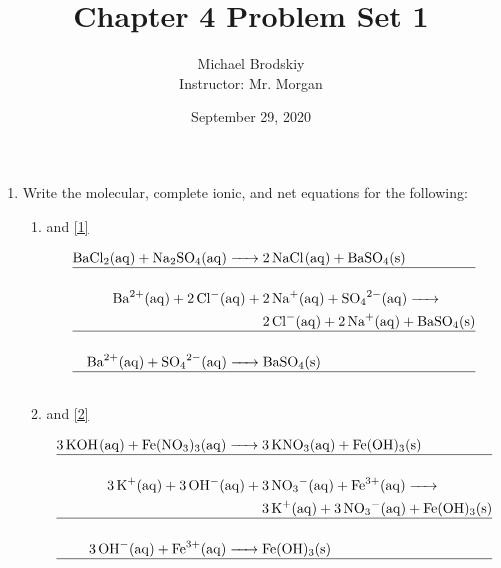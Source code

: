 \documentclass[12pt]{article}
\title{Chapter 4 Problem Set 1}
\date{September 29, 2020}
\author{Michael Brodskiy\\ \small Instructor: Mr. Morgan}
\begin{document}
\maketitle

\begin{enumerate}

  \item Write the molecular, complete ionic, and net equations for the following:

    \begin{enumerate}

      \item {} and  \eqref{1}

        \begin{equation}
          \begin{split}
            \ce{BaCl2(aq) + Na2SO4(aq) -> } & \ce{2NaCl(aq) + BaSO4(s)}\\
            \hline
            & \\
            \ce{Ba^2+(aq) + 2Cl-(aq) + } & \ce{2Na+(aq) + SO4^2-(aq) ->} \\
            & \ce{2Cl-(aq) + 2Na+(aq) + BaSO4(s)} \\
            \hline
            & \\
            \ce{Ba^2+(aq) + SO4^2-(aq) -> } & \ce{BaSO4(s)} \\
            \hline
            & \\
          \end{split}
          \label{1}
        \end{equation}

      \item {} and  \eqref{2}

        \begin{equation}
          \begin{split}
            \ce{3KOH(aq) + Fe(NO3)3(aq) -> } & \ce{3KNO3(aq) + Fe(OH)3(s)}\\
            \hline
            & \\
            \ce{3K+(aq) + 3OH-(aq) + } & \ce{3NO3-(aq) + Fe^3+(aq) ->}\\
            & \ce{3K+(aq) + 3NO3-(aq) + Fe(OH)3(s)}\\
            \hline
            & \\
            \ce{3OH-(aq) + Fe^3+(aq) -> } & \ce{Fe(OH)3(s)}\\
            \hline
            & \\
          \end{split}
          \label{2}
        \end{equation}


\end{enumerate}
\end{enumerate}
\end{document}
